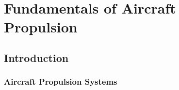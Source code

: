\chapter{Fundamentals of Aircraft Propulsion}
\section{Introduction}
\subsection{Aircraft Propulsion Systems}
